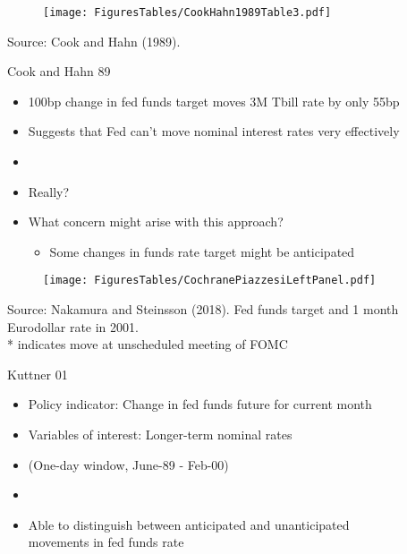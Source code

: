 \documentclass[11pt,aspectratio=169,xcolor={dvipsnames},hyperref={pdftex,pdfpagemode=UseNone,hidelinks,pdfdisplaydoctitle=true},usepdftitle=false]{beamer}
\begin{document}
\begin{frame}
\begin{figure}
\centering
\texttt{[image: FiguresTables/CookHahn1989Table3.pdf]}
\end{figure}
\vspace{-5mm}
{\scriptsize Source: Cook and Hahn (1989).}
\end{frame}


\begin{frame}{Cook and Hahn 89}
\begin{itemize}
\item 100bp change in fed funds target moves 3M Tbill rate by only 55bp
\item Suggests that Fed can't move nominal interest rates very effectively
\item[]
\item Really?
\item What concern might arise with this approach? \pause
\begin{itemize}
\item Some changes in funds rate target might be anticipated
\end{itemize}
\end{itemize}
\end{frame}

\begin{frame}
\begin{figure}
\centering
\texttt{[image: FiguresTables/CochranePiazzesiLeftPanel.pdf]}
\end{figure}
\vspace{-4mm}
{\scriptsize Source: Nakamura and Steinsson (2018). Fed funds target and 1 month Eurodollar rate in 2001. \\ \vspace{-5pt} * indicates move at unscheduled meeting of FOMC}
\end{frame}

\begin{frame}{Kuttner 01}
\begin{itemize}
\item Policy indicator: Change in fed funds future for current month
\item Variables of interest: Longer-term nominal rates
\item[] (One-day window, June-89 - Feb-00) 
\item[]
\item Able to distinguish between anticipated and unanticipated \\ movements in fed funds rate
\end{itemize}
\end{frame}
\end{document}
